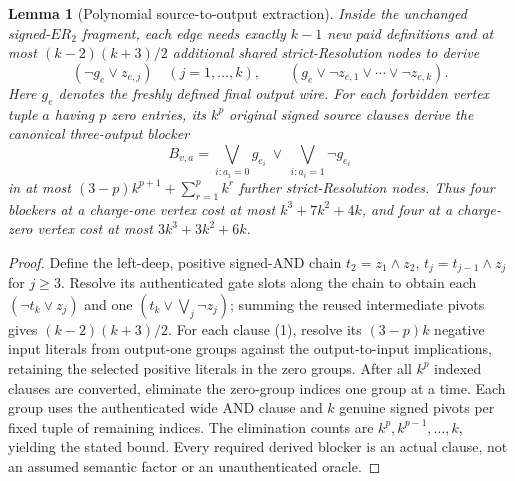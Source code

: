 \documentclass[11pt]{article}
\newtheorem{lemma}{Lemma}
\begin{document}
\begin{lemma}[Polynomial source-to-output extraction]
Inside the unchanged signed-$ER_2$ fragment, each edge needs exactly $k-1$ new paid definitions and at most $(k-2)(k+3)/2$ additional shared strict-Resolution nodes to derive
\[
(\neg g_e\vee z_{e,j})\quad(j=1,\ldots,k),
\qquad (g_e\vee\neg z_{e,1}\vee\cdots\vee\neg z_{e,k}).
\]
Here $g_e$ denotes the freshly defined final output wire. For each forbidden vertex tuple $a$ having $p$ zero entries, its $k^p$ original signed source clauses derive the canonical three-output blocker
\[
B_{v,a}=\bigvee_{i:a_i=0}g_{e_i}\ \vee\ \bigvee_{i:a_i=1}\neg g_{e_i}
\]
in at most $(3-p)k^{p+1}+\sum_{r=1}^{p}k^r$ further strict-Resolution nodes. Thus four blockers at a charge-one vertex cost at most $k^3+7k^2+4k$, and four at a charge-zero vertex cost at most $3k^3+3k^2+6k$.
\end{lemma}
\begin{proof}
Define the left-deep, positive signed-AND chain $t_2=z_1\wedge z_2$, $t_j=t_{j-1}\wedge z_j$ for $j\ge3$. Resolve its authenticated gate slots along the chain to obtain each $(\neg t_k\vee z_j)$ and one $(t_k\vee\bigvee_j\neg z_j)$; summing the reused intermediate pivots gives $(k-2)(k+3)/2$. For each clause (1), resolve its $(3-p)k$ negative input literals from output-one groups against the output-to-input implications, retaining the selected positive literals in the zero groups. After all $k^p$ indexed clauses are converted, eliminate the zero-group indices one group at a time. Each group uses the authenticated wide AND clause and $k$ genuine signed pivots per fixed tuple of remaining indices. The elimination counts are $k^p,k^{p-1},\ldots,k$, yielding the stated bound. Every required derived blocker is an actual clause, not an assumed semantic factor or an unauthenticated oracle.
\end{proof}
\end{document}

